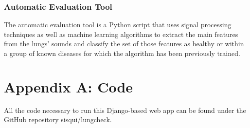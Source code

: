 \documentclass{scrreprt}
\begin{document}
\subsection{Automatic Evaluation Tool}
The automatic evaluation tool is a Python script that uses signal processing techniques as well as machine learning algorithms to extract the main features from the lungs' sounds and classify the set of those features as healthy or within a group of known diseases for which the algorithm has been previously trained.






\chapter*{Appendix A: Code}
All the code necessary to run this Django-based web app can be found under the GitHub repository sisqui/lungcheck.
\end{document}
